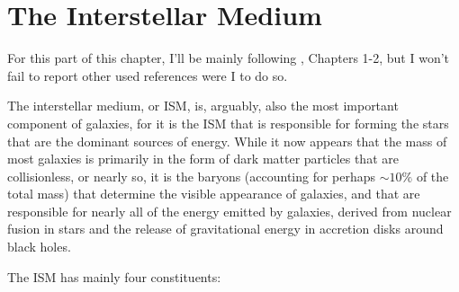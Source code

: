 
\chapter{The Interstellar Medium}\label{ch:i}

For this part of this chapter, I'll be mainly following \cite{2011piim.book.....D}, Chapters 1-2, but I won't fail to report other used references were I to do so.
\par The interstellar medium, or ISM, is, arguably, also the most important component of galaxies, for it is the ISM that is responsible for forming the stars that are the dominant sources of energy. While it now appears that the mass of most galaxies is primarily in the form of dark matter particles that are collisionless, or nearly so, it is the baryons (accounting for perhaps $\sim 10\%$ of the total mass) that determine the visible appearance of galaxies, and that are responsible for nearly all of the energy emitted by galaxies, derived from nuclear fusion in stars and the release of gravitational energy in accretion disks around black holes.
\par The ISM has mainly four constituents:

